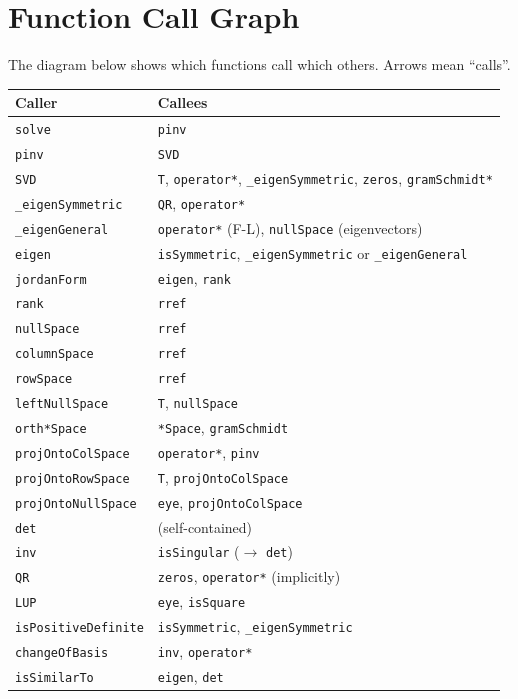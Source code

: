 \documentclass[12pt, a4paper]{article}
\newcommand{\fn}[1]{\texttt{\small\color{funcgreen}#1}}
\begin{document}
\section{Function Call Graph}

The diagram below shows which functions call which others.
Arrows mean ``calls''.

\begin{center}
\small
\begin{tabular}{ll}
\toprule
Caller & Callees \\
\midrule
\fn{solve}        & \fn{pinv} \\
\fn{pinv}         & \fn{SVD} \\
\fn{SVD}          & \fn{T}, \fn{operator*}, \fn{\_eigenSymmetric}, \fn{zeros}, \fn{gramSchmidt*} \\
\fn{\_eigenSymmetric} & \fn{QR}, \fn{operator*} \\
\fn{\_eigenGeneral}  & \fn{operator*} (F-L), \fn{nullSpace} (eigenvectors) \\
\fn{eigen}        & \fn{isSymmetric}, \fn{\_eigenSymmetric} or \fn{\_eigenGeneral} \\
\fn{jordanForm}   & \fn{eigen}, \fn{rank} \\
\fn{rank}         & \fn{rref} \\
\fn{nullSpace}    & \fn{rref} \\
\fn{columnSpace}  & \fn{rref} \\
\fn{rowSpace}     & \fn{rref} \\
\fn{leftNullSpace} & \fn{T}, \fn{nullSpace} \\
\fn{orth*Space}   & \fn{*Space}, \fn{gramSchmidt} \\
\fn{projOntoColSpace} & \fn{operator*}, \fn{pinv} \\
\fn{projOntoRowSpace} & \fn{T}, \fn{projOntoColSpace} \\
\fn{projOntoNullSpace} & \fn{eye}, \fn{projOntoColSpace} \\
\fn{det}          & (self-contained) \\
\fn{inv}          & \fn{isSingular} ($\to$ \fn{det}) \\
\fn{QR}           & \fn{zeros}, \fn{operator*} (implicitly) \\
\fn{LUP}          & \fn{eye}, \fn{isSquare} \\
\fn{isPositiveDefinite} & \fn{isSymmetric}, \fn{\_eigenSymmetric} \\
\fn{changeOfBasis} & \fn{inv}, \fn{operator*} \\
\fn{isSimilarTo}  & \fn{eigen}, \fn{det} \\
\bottomrule
\end{tabular}
\end{center}
\end{document}
